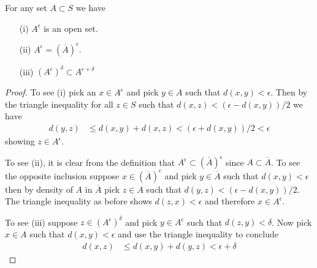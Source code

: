 \begin{lem}For any set $A \subset S$ we have 
\begin{itemize}
\item[(i)]$A^\epsilon$ is an open set.
\item[(ii)]$A^\epsilon = (\overline{A})^\epsilon$.
\item[(iii)]$(A^\epsilon)^\delta \subset A^{\epsilon + \delta}$
\end{itemize}
\end{lem}
\begin{proof}
To see (i) pick an $x \in A^\epsilon$ and pick $y \in A$ such that
$d(x,y) < \epsilon$.  Then by the triangle inequality for all $z \in
S$ such that $d(x,z) < (\epsilon - d(x,y))/2$ we have
\begin{align*}
d(y,z) &\leq d(x,y) + d(x,z) < (\epsilon + d(x,y))/2 < \epsilon
\end{align*}
showing $z \in A^\epsilon$.

To see (ii), it is clear from the definition that $A^\epsilon \subset
(\overline{A})^\epsilon$ since $A \subset \overline{A}$.  To see the
opposite inclusion suppose $x \in (\overline{A})^\epsilon$ and pick $y
\in \overline{A}$ such that $d(x,y) < \epsilon$ then by density of $A$
in $\overline{A}$ pick $z \in A$ such that $d(y,z) < (\epsilon -
d(x,y))/2$.  The triangle inequality as before shows $d(z,x) < \epsilon$ and
therefore $x \in A^\epsilon$.

To see (iii) suppose $z \in (A^\epsilon)^\delta$ and pick $y \in
A^\epsilon$ such that $d(z,y) < \delta$.  Now pick $x \in A$ such that
$d(x,y) < \epsilon$ and use the triangle inequality to conclude
\begin{align*}
d(x,z) &\leq d(x,y) + d(y,z) < \epsilon + \delta
\end{align*}
\end{proof}

